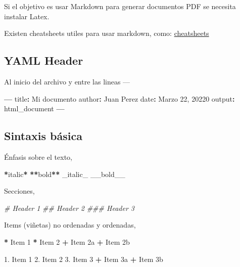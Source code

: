 \documentclass[
]{book}
\newenvironment{Shaded}{\begin{snugshade}}{\end{snugshade}}
\newcommand{\CommentTok}[1]{\textcolor[rgb]{0.56,0.35,0.01}{\textit{#1}}}
\newcommand{\DecValTok}[1]{\textcolor[rgb]{0.00,0.00,0.81}{#1}}
\newcommand{\ErrorTok}[1]{\textcolor[rgb]{0.64,0.00,0.00}{\textbf{#1}}}
\newcommand{\FloatTok}[1]{\textcolor[rgb]{0.00,0.00,0.81}{#1}}
\newcommand{\NormalTok}[1]{#1}
\newcommand{\OperatorTok}[1]{\textcolor[rgb]{0.81,0.36,0.00}{\textbf{#1}}}
\newcommand{\StringTok}[1]{\textcolor[rgb]{0.31,0.60,0.02}{#1}}
\begin{document}
Si el objetivo es usar Markdown para generar documentos PDF se necesita instalar Latex.

Existen cheatsheets utiles para usar markdown, como: \href{https://github.com/rstudio/cheatsheets/raw/master/rmarkdown-2.0.pdf}{cheatsheets}

\hypertarget{yaml-header}{%
\subsection{YAML Header}\label{yaml-header}}

Al inicio del archivo y entre las lineas ---

\begin{Shaded}
\begin{Highlighting}[]
\OperatorTok{---}
\NormalTok{title}\OperatorTok{:}\StringTok{ }\NormalTok{Mi documento}
\NormalTok{author}\OperatorTok{:}\StringTok{ }\NormalTok{Juan Perez}
\NormalTok{date}\OperatorTok{:}\StringTok{ }\NormalTok{Marzo }\DecValTok{22}\NormalTok{, }\DecValTok{20220}
\NormalTok{output}\OperatorTok{:}\StringTok{ }\NormalTok{html_document}
\OperatorTok{---}
\end{Highlighting}
\end{Shaded}

\hypertarget{sintaxis-buxe1sica}{%
\subsection{Sintaxis básica}\label{sintaxis-buxe1sica}}

Énfasis sobre el texto,

\begin{Shaded}
\begin{Highlighting}[]
\OperatorTok{*}\NormalTok{italic}\OperatorTok{*}\StringTok{   }\ErrorTok{**}\NormalTok{bold}\OperatorTok{**}
\NormalTok{_italic_   __bold__}
\end{Highlighting}
\end{Shaded}

Secciones,

\begin{Shaded}
\begin{Highlighting}[]
\CommentTok{# Header 1}
\CommentTok{## Header 2}
\CommentTok{### Header 3}
\end{Highlighting}
\end{Shaded}

Items (viñetas) no ordenadas y ordenadas,

\begin{Shaded}
\begin{Highlighting}[]
\OperatorTok{*}\StringTok{ }\NormalTok{Item }\DecValTok{1}
\OperatorTok{*}\StringTok{ }\NormalTok{Item }\DecValTok{2}
    \OperatorTok{+}\StringTok{ }\NormalTok{Item 2a}
    \OperatorTok{+}\StringTok{ }\NormalTok{Item 2b}

\FloatTok{1.}\NormalTok{ Item }\DecValTok{1}
\FloatTok{2.}\NormalTok{ Item }\DecValTok{2}
\FloatTok{3.}\NormalTok{ Item }\DecValTok{3}
    \OperatorTok{+}\StringTok{ }\NormalTok{Item 3a}
    \OperatorTok{+}\StringTok{ }\NormalTok{Item 3b}
\end{Highlighting}
\end{Shaded}
\end{document}
